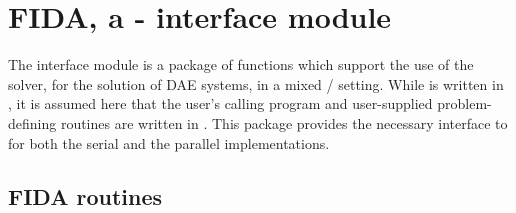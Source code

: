 \section{FIDA, a {\F}-{\C} interface module}\label{ss:fcmix}

The {\fida} interface module is a package of {\C} functions which support
the use of the {\ida} solver, for the solution of DAE systems, in a mixed
{\F}/{\C} setting.  While {\ida} is written in {\C}, it is assumed here
that the user's calling program and user-supplied problem-defining routines
are written in {\F}. This package provides the necessary interface to {\ida}
for both the serial and the parallel {\nvector} implementations.

\subsection{FIDA routines}\label{sss:fidaroutines}

